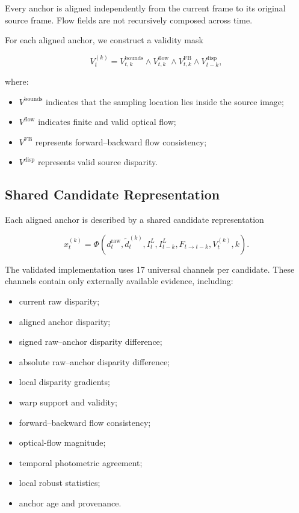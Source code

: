 \documentclass[11pt,a4paper]{article}
\begin{document}
Every anchor is aligned independently from the current frame to its
original source frame.
Flow fields are not recursively composed across time.

For each aligned anchor, we construct a validity mask

\begin{equation}
V_t^{(k)}
=
V_{t,k}^{\mathrm{bounds}}
\land
V_{t,k}^{\mathrm{flow}}
\land
V_{t,k}^{\mathrm{FB}}
\land
V_{t-k}^{\mathrm{disp}},
\label{eq:validity}
\end{equation}

where:

\begin{itemize}
    \item \(V^{\mathrm{bounds}}\) indicates that the sampling location
    lies inside the source image;
    \item \(V^{\mathrm{flow}}\) indicates finite and valid optical flow;
    \item \(V^{\mathrm{FB}}\) represents forward--backward flow
    consistency;
    \item \(V^{\mathrm{disp}}\) represents valid source disparity.
\end{itemize}

\subsection{Shared Candidate Representation}
\label{sec:candidate_representation}

Each aligned anchor is described by a shared candidate representation

\begin{equation}
x_t^{(k)}
=
\Phi
\left(
d_t^{\mathrm{raw}},
\widetilde d_t^{(k)},
I_t^L,
I_{t-k}^L,
F_{t\rightarrow t-k},
V_t^{(k)},
k
\right).
\end{equation}

The validated implementation uses 17 universal channels per candidate.
These channels contain only externally available evidence, including:

\begin{itemize}
    \item current raw disparity;
    \item aligned anchor disparity;
    \item signed raw--anchor disparity difference;
    \item absolute raw--anchor disparity difference;
    \item local disparity gradients;
    \item warp support and validity;
    \item forward--backward flow consistency;
    \item optical-flow magnitude;
    \item temporal photometric agreement;
    \item local robust statistics;
    \item anchor age and provenance.
\end{itemize}
\end{document}
